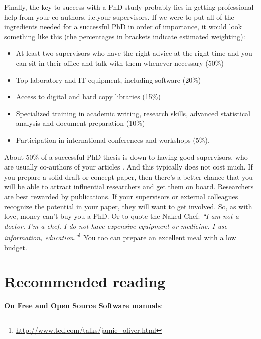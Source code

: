 \documentclass[graybox,envcountchap,sectrefs,UStrade]{svmono}
\begin{document}
Finally, the key to success with a PhD study probably lies in getting professional help from your co-authors, i.e.\@ your supervisors. If we were to put all of the ingredients needed for a successful PhD in order of importance, it would look something like this (the percentages in brackets indicate estimated weighting):

\begin{itemize}
  \item At least two supervisors who have the right advice at the right time and you can sit in their office and talk with them whenever necessary (50\%)
  \item Top laboratory and IT equipment, including software (20\%)
  \item Access to digital and hard copy libraries (15\%)
  \item Specialized training in academic writing, research skills, advanced statistical analysis and document preparation (10\%)
  \item Participation in international conferences and workshops (5\%).
\end{itemize}

About 50\% of a successful PhD thesis is down to having good supervisors, who are usually co-authors of your articles \citep{Creedy2008research}. And this typically does not cost much. If you prepare a solid draft or concept paper, then there's a better chance that you will be able to attract influential researchers and get them on board. Researchers are best rewarded by publications. If your supervisors or external colleagues recognize the potential in your paper, they will want to get involved. So, as with love, money can't buy you a PhD. Or to quote the Naked Chef: \emph{``I am not a doctor. I'm a chef. I do not have expensive equipment or medicine. I use information, education.''}\footnote{\url{http://www.ted.com/talks/jamie_oliver.html}} You too can prepare an excellent meal with a low budget.\par


\newpage

\section*{Recommended reading}

\noindent \textbf{On Free and Open Source Software manuals}:
\end{document}
